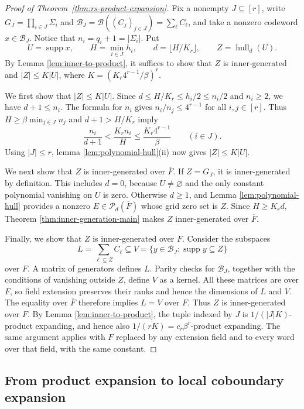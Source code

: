 \documentclass[11pt,letterpaper]{article}
\renewcommand{\le}{\leqslant}
\renewcommand{\ge}{\geqslant}
\theoremstyle{definition}
\theoremstyle{remark}
\newcommand{\cB}{\mathcal B}
\newcommand{\supp}{\operatorname{supp}}
\begin{document}
\begin{proof}[Proof of Theorem~\ref{thm:rs-product-expansion}]
Fix a nonempty $J\subseteq[r]$, write
$G_J=\prod_{i\in J}\Sigma_i$ and $\cB_J=\mathcal{B}((C_j)_{j\in J}) = \sum_\ell C_\ell$, and
take a nonzero codeword $x\in\cB_J$. Notice that $n_i = q_i + 1 = |\Sigma_i|$. Put
$$U=\supp x,\qquad H=\min_{i\in J}h_i,\qquad
 d=\lfloor H/K_r\rfloor,\qquad Z=\operatorname{hull}_d(U).$$   By Lemma \ref{lem:inner-to-product}, it suffices to show that $Z$ is
inner-generated and $|Z|\le K|U|$, where
$K=(K_r4^{r-1}/\beta)^r$.

We first show that $|Z|\le K|U|$. Since $d\le H/K_r\le h_i/2\le n_i/2$ and $n_i\ge2$, we have $d+1\le n_i$. The formula for $n_i$ gives
$n_i/n_j\le4^{r-1}$ for all $i,j\in[r]$.
Thus $H\ge\beta\min_{j\in J}n_j$ and $d+1>H/K_r$ imply
\[
 \frac{n_i}{d+1}<\frac{K_r n_i}{H}
 \le\frac{K_r4^{r-1}}{\beta}\qquad(i\in J).
\]
Using $|J|\le r$, lemma \ref{lem:polynomial-hull}(ii) now gives
$|Z|\le K|U|$.

We next show that $Z$ is inner-generated over $\overline F$. If $Z=G_J$, it is inner-generated by definition.
This includes $d=0$, because $U\ne\varnothing$ and the only
constant polynomial vanishing on $U$ is zero.
Otherwise $d\ge1$, and Lemma \ref{lem:polynomial-hull} provides
a nonzero $E\in\mathcal P_d(\overline F)$ whose grid zero set is $Z$.
Since $H\ge K_rd$, Theorem \ref{thm:inner-generation-main} makes $Z$
inner-generated over $\overline F$.

Finally, we show that $Z$ is inner-generated over $F$. Consider the subspaces
\[
 L=\sum_{\ell\subseteq Z}C_\ell
 \subseteq
 V=\{y\in\cB_J:\supp y\subseteq Z\}
\]
over $F$. A matrix of generators defines $L$. Parity checks for
$\cB_J$, together with the conditions of vanishing outside $Z$,
define $V$ as a kernel. All these matrices are over $F$, so field
extension preserves their ranks and hence the dimensions of
$L$ and $V$. The equality over $\overline F$ therefore implies $L=V$
over $F$. Thus $Z$ is inner-generated over $F$.
By Lemma \ref{lem:inner-to-product}, the tuple indexed by $J$ is
$1/(|J|K)$-product expanding, and hence also
$1/(rK)=c_r\beta^r$-product expanding.
The same argument applies with $F$ replaced by any extension
field and to every word over that field, with the same constant.
\end{proof}
\subsection{From product expansion to local coboundary expansion}
\label{sec:product-to-local}
\end{document}
